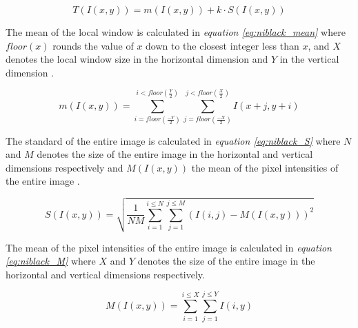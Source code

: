\documentclass[11pt]{article}
\begin{document}
				\begin{large}
				\begin{equation} \label{eq:niblack}
					T(I(x, y)) = m(I(x, y)) + k \cdot S(I(x, y))
				\end{equation}
				\end{large}

				\newpage

				The mean of the local window is calculated in \textit{equation \ref{eq:niblack_mean}} where $floor(x)$ rounds the value of $x$ down to the closest integer less than $x$, and $X$ denotes the local window size in the horizontal dimension and $Y$ in the vertical dimension \cite{khurshid2009comparison}.

				\begin{large}
				\begin{equation} \label{eq:niblack_mean}
					m(I(x, y)) = \sum_{i = floor(\frac{-Y}{2})}^{i < floor(\frac{Y}{2})}\sum_{j = floor(\frac{-X}{2})}^{j < floor(\frac{X}{2})} I(x + j, y + i)
				\end{equation}
				\end{large}

				The standard of the entire image is calculated in \textit{equation \ref{eq:niblack_S}} where $N$ and $M$ denotes the size of the entire image in the horizontal and vertical dimensions respectively and $M(I(x, y))$ the mean of the pixel intensities of the entire image \cite{khurshid2009comparison}.

				\begin{large}
				\begin{equation} \label{eq:niblack_S}
					S(I(x, y)) = \sqrt{\frac{1}{NM} \sum_{i = 1}^{i \leq N}\sum_{j = 1}^{j \leq M}(I(i, j) - M(I(x, y)))^2}
				\end{equation}
				\end{large}

				The mean of the pixel intensities of the entire image is calculated in \textit{equation \ref{eq:niblack_M}} where $X$ and $Y$ denotes the size of the entire image in the horizontal and vertical dimensions respectively.

				\begin{large}
				\begin{equation} \label{eq:niblack_M}
					M(I(x, y)) = \sum_{i = 1}^{i \leq X}\sum_{j = 1}^{j \leq Y} I(i, y)
				\end{equation}
				\end{large}
\end{document}
